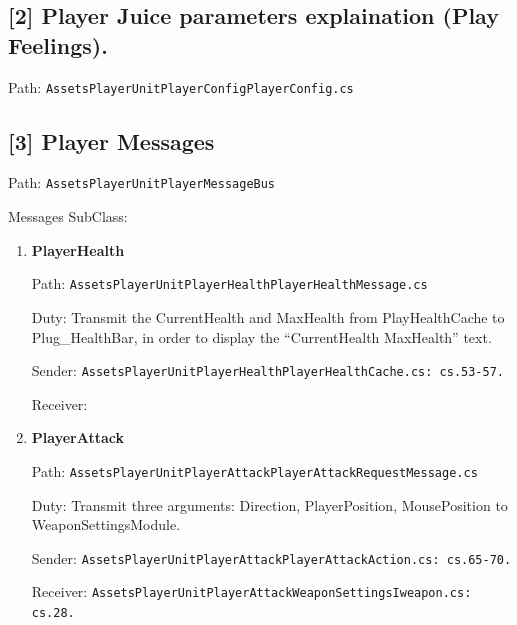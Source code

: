 \subsection{[2] Player Juice parameters explaination (Play Feelings).}

Path: \texttt{\bs Assets\bs PlayerUnit\bs PlayerConfig\bs PlayerConfig.cs}


\subsection{[3] Player Messages}

Path: \texttt{\bs Assets\bs PlayerUnit\bs PlayerMessageBus}

Messages SubClass:

\begin{enumerate}
  \item \textbf{PlayerHealth}

  Path: \texttt{\bs Assets\bs PlayerUnit\bs PlayerHealth\bs PlayerHealthMessage.cs}

  Duty: Transmit the CurrentHealth and MaxHealth from PlayHealthCache to Plug\_HealthBar, in order to display the ``CurrentHealth\bs{} MaxHealth'' text.

  Sender: \texttt{\bs Assets\bs PlayerUnit\bs PlayerHealth\bs PlayerHealthCache.cs: cs.53-57.}

  Receiver: 

  \item \textbf{PlayerAttack}

  Path: \texttt{\bs Assets\bs PlayerUnit\bs PlayerAttack\bs PlayerAttackRequestMessage.cs}

  Duty: Transmit three arguments: Direction, PlayerPosition, MousePosition to WeaponSettingsModule.

  Sender: \texttt{\bs Assets\bs PlayerUnit\bs PlayerAttack\bs PlayerAttackAction.cs: cs.65-70.}

  Receiver: \texttt{\bs Assets\bs PlayerUnit\bs PlayerAttack\bs WeaponSettings\bs Iweapon.cs: cs.28.}
\end{enumerate}
